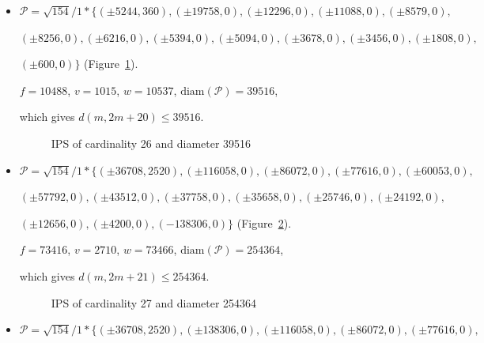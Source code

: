 \documentclass[12pt]{article}
\theoremstyle{theorem}
\theoremstyle{dfn}
\theoremstyle{remark}
\begin{document}
\begin{itemize}
\item
$\mathcal{P}=\sqrt{154}/{1} * \{ (\pm 5244, 360),
(\pm 19758 , 0),
(\pm 12296 , 0),
(\pm 11088 , 0),
(\pm 8579 , 0),
$

$
(\pm 8256 , 0),
(\pm 6216 , 0),
(\pm 5394 , 0),
(\pm 5094 , 0),
(\pm 3678 , 0),
(\pm 3456 , 0),
(\pm 1808 , 0),
$

$
(\pm 600 , 0)\}
$
(Figure~\ref{picture_22.png}).

$f = 10488$, $v = 1015$, $w = 10537$, $\operatorname{diam(\mathcal{P})} = 39516$,

which gives $d(m, 2m + 20) \leq 39516$.


\begin{figure}[h!]
\parbox{1\linewidth}{\caption{IPS of cardinality 26 and diameter 39516}
\label{picture_22.png}}
\end{figure}


\item
$\mathcal{P}=\sqrt{154}/{1} * \{ (\pm 36708, 2520),
(\pm 116058 , 0),
(\pm 86072 , 0),
(\pm 77616 , 0),
(\pm 60053 , 0),
$

$
(\pm 57792 , 0),
(\pm 43512 , 0),
(\pm 37758 , 0),
(\pm 35658 , 0),
(\pm 25746 , 0),
(\pm 24192 , 0),
$

$
(\pm 12656 , 0),
(\pm 4200 , 0),
(-138306 , 0)\}
$
(Figure~\ref{picture_23.png}).

$f = 73416$, $v = 2710$, $w = 73466$, $\operatorname{diam(\mathcal{P})} = 254364$,

which gives $d(m, 2m + 21) \leq 254364$.


\begin{figure}[h!]
\parbox{1\linewidth}{\caption{IPS of cardinality 27 and diameter 254364}
\label{picture_23.png}}
\end{figure}


\item
$\mathcal{P}=\sqrt{154}/{1} * \{ (\pm 36708, 2520),
(\pm 138306 , 0),
(\pm 116058 , 0),
(\pm 86072 , 0),
(\pm 77616 , 0),
$


\end{itemize}
\end{document}
